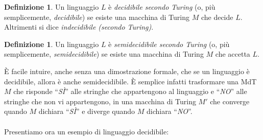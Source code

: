 \documentclass[12pt,a4paper]{report}
\theoremstyle{definition}
\newtheorem{defn}[teo]{Definizione}  %
\begin{document}
\begin{defn}
Un linguaggio $L$ è \emph{decidibile secondo Turing} (o, più semplicemente, \emph{decidibile}) se esiste una macchina di Turing $M$ che decide $L$. Altrimenti si dice \emph{indecidibile (secondo Turing)}.
\end{defn}

\begin{defn}
Un linguaggio $L$ è \emph{semidecidibile secondo Turing} (o, più semplicemente, \emph{semidecidibile}) se esiste una macchina di Turing $M$ che accetta $L$.
\end{defn}

È facile intuire, anche senza una dimostrazione formale, che se un linguaggio è decidibile, allora è anche semidecidibile. È semplice infatti trasformare una MdT $M$ che risponde ``\emph{SÌ}'' alle stringhe che appartengono al linguaggio e ``\emph{NO}'' alle stringhe che non vi appartengono, in una macchina di Turing $M'$ che converge quando $M$ dichiara ``\emph{SÌ}'' e diverge quando $M$ dichiara ``\emph{NO}''.\\
\\
Presentiamo ora un esempio di linguaggio decidibile:
\end{document}
